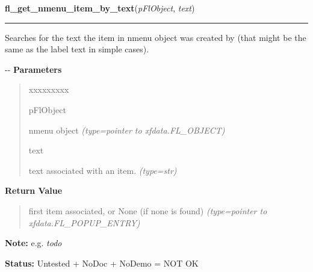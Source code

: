     \vspace{0.5ex}

\hspace{.8\funcindent}\begin{boxedminipage}{\funcwidth}

    \raggedright \textbf{fl\_get\_nmenu\_item\_by\_text}(\textit{pFlObject}, \textit{text})

    \vspace{-1.5ex}

    \rule{\textwidth}{0.5\fboxrule}
\setlength{\parskip}{2ex}

Searches for the text the item in nmenu object was created by (that
might be the same as the label text in simple cases).

-{}-
\setlength{\parskip}{1ex}
      \textbf{Parameters}
      \vspace{-1ex}

      \begin{quote}
        \begin{Ventry}{xxxxxxxxx}

          \item[pFlObject]


nmenu object
            {\it (type=pointer to xfdata.FL\_OBJECT)}

          \item[text]


text associated with an item.
            {\it (type=str)}

        \end{Ventry}

      \end{quote}

      \textbf{Return Value}
    \vspace{-1ex}

      \begin{quote}

first item associated, or None (if none is found)
      {\it (type=pointer to xfdata.FL\_POPUP\_ENTRY)}

      \end{quote}

\textbf{Note:} 
e.g. \emph{todo}


\textbf{Status:} 
Untested + NoDoc + NoDemo = NOT OK


    \end{boxedminipage}

    \label{xformslib:flnmenu:fl_set_nmenu_policy}

